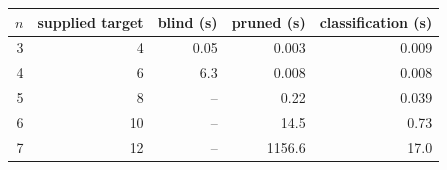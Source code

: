 \begin{tabular}{rrrrr}
\toprule
$n$ & supplied target & blind (s) & pruned (s) & classification (s) \\
\midrule
3 & 4  & 0.05 & 0.003 & 0.009 \\
4 & 6  & 6.3  & 0.008 & 0.008 \\
5 & 8  & --   & 0.22  & 0.039 \\
6 & 10 & --   & 14.5  & 0.73  \\
7 & 12 & --   & 1156.6 & 17.0 \\
\bottomrule
\end{tabular}
